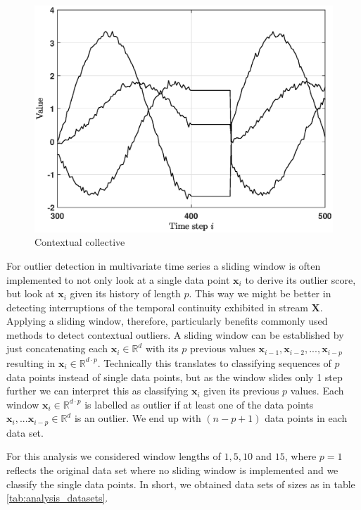 \begin{figure}[h]
\begin{minipage}{0.333\textwidth}
		\includegraphics[scale=0.27]{analysis/Example_timeseries_collective_frac}
		\caption{Contextual collective}
		\label{fig:analysis_collective}
	\end{minipage}
\end{figure}

For outlier detection in multivariate time series a sliding window is often implemented to not only look at a single data point $\mathbf{x}_i$ to derive its outlier score, but look at $\mathbf{x}_i$ given its history of length $p$. This way we might be better in detecting interruptions of the temporal continuity exhibited in stream $\mathbf{X}$. Applying a sliding window, therefore, particularly benefits commonly used methods to detect contextual outliers. A sliding window can be established by just concatenating each $\mathbf{x}_i \in \mathbb{R}^d$ with its $p$ previous values $\mathbf{x}_{i-1},\mathbf{x}_{i-2},...,\mathbf{x}_{i-p}$ resulting in $\mathbf{x}_i \in \mathbb{R}^{d \cdot p}$.
Technically this translates to classifying sequences of $p$ data points instead of single data points, but as the window slides only 1 step further we can interpret this as classifying $\mathbf{x}_i$ given its previous $p$ values. Each window $\mathbf{x}_i \in \mathbb{R}^{d \cdot p}$ is labelled as outlier if at least one of the data points $\mathbf{x}_i,...\mathbf{x}_{i-p} \in \mathbb{R}^d$ is an outlier. We end up with $(n − p + 1)$ data points in each data set. 

For this analysis we considered window lengths of $1, 5, 10$ and $15$, where $p=1$ reflects the original data set where no sliding window is implemented and we classify the single data points. In short, we obtained data sets of sizes as in table \ref{tab:analysis_datasets}.

